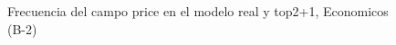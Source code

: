 \begin{figure}[H]
    \centering
    
    \caption{Frecuencia del campo  price en el modelo real y top2+1, Economicos (B-2)}
    \label{frecuency- Price-top2+1}
\end{figure}